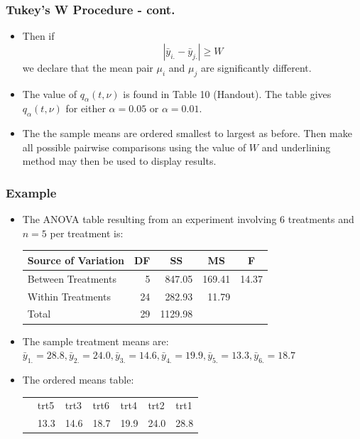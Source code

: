 \documentclass[xcolor=dvipsnames,12pt]{beamer}
\begin{document}
\begin{frame}
\frametitle{Tukey's W Procedure - cont.} 
\begin{itemize}
\item Then if
$$
  |\bar{y}_{i.} - \bar{y}_{j.}| \geq W 
$$
we declare that the mean pair $\mu_i$ and $\mu_j$ are
significantly different.  
\item The value of $q_\alpha(t,\nu)$ is found in 
Table 10 (Handout).  The table gives $q_\alpha(t,\nu)$ for
either $\alpha=0.05$ or $\alpha=0.01$. 
\item  The the sample means are ordered smallest to largest as before. 
Then make all possible pairwise comparisons using
the value of $W$ and underlining method may then be used to display results. 
\end{itemize}
\end{frame}



\begin{frame}
\frametitle{Example} 
\begin{itemize}
\item The ANOVA table resulting from an experiment involving 6 treatments and $n=5$
per treatment is:\\[.1in]
\begin{tabular}{lrrrr}
Source of Variation & DF &
\multicolumn{1}{c}{SS} &
\multicolumn{1}{c}{MS} &
\multicolumn{1}{c}{F} \\ \hline
Between Treatments & 5 & 847.05 & 169.41 & 14.37 \\
Within Treatments & 24 & 282.93 & 11.79 \\ \hline
Total & 29 & 1129.98
\end{tabular}
\vspace*{.05in}

\item The sample treatment means are:
$\bar{y}_{1.}= 28.8, \bar{y}_{2.} = 24.0, \bar{y}_{3.} = 14.6, \bar{y}_{4.} = 19.9, \bar{y}_{5.} = 13.3, \bar{y}_{6.} =18.7 $\\[.1in]
\item The ordered means table: \\[-.5in]
\begin{center}
\begin{tabular}{lllllll}
& trt5 & trt3 & trt6 & trt4 & trt2 & trt1 \\
& 13.3 & 14.6 & 18.7 &  19.9 & 24.0 & 28.8\\
\end{tabular}
\end{center}
\end{itemize}
\end{frame}
\end{document}
